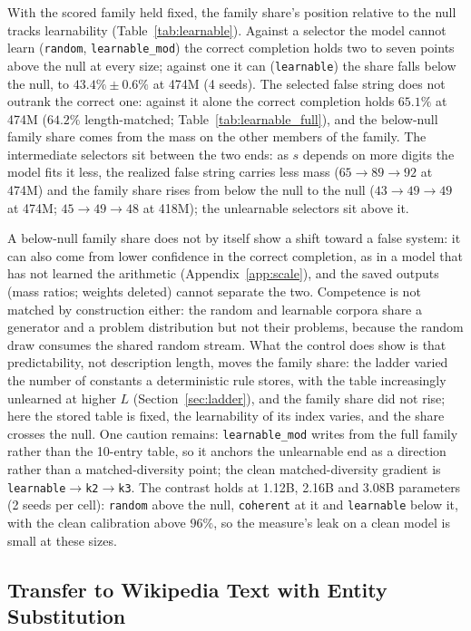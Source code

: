 \documentclass{article}
\begin{document}
With the scored family held fixed, the family share's position relative to the null tracks learnability (Table~\ref{tab:learnable}). Against a selector the model cannot learn (\texttt{random}, \texttt{learnable\_mod}) the correct completion holds two to seven points above the null at every size; against one it can (\texttt{learnable}) the share falls below the null, to $43.4\% \pm 0.6\%$ at 474M (4 seeds). The selected false string does not outrank the correct one: against it alone the correct completion holds $65.1\%$ at 474M ($64.2\%$ length-matched; Table~\ref{tab:learnable_full}), and the below-null family share comes from the mass on the other members of the family. The intermediate selectors sit between the two ends: as $s$ depends on more digits the model fits it less, the realized false string carries less mass ($65 \to 89 \to 92$ at 474M) and the family share rises from below the null to the null ($43 \to 49 \to 49$ at 474M; $45 \to 49 \to 48$ at 418M); the unlearnable selectors sit above it.

A below-null family share does not by itself show a shift toward a false system: it can also come from lower confidence in the correct completion, as in a model that has not learned the arithmetic (Appendix~\ref{app:scale}), and the saved outputs (mass ratios; weights deleted) cannot separate the two. Competence is not matched by construction either: the random and learnable corpora share a generator and a problem distribution but not their problems, because the random draw consumes the shared random stream. What the control does show is that predictability, not description length, moves the family share: the ladder varied the number of constants a deterministic rule stores, with the table increasingly unlearned at higher $L$ (Section~\ref{sec:ladder}), and the family share did not rise; here the stored table is fixed, the learnability of its index varies, and the share crosses the null. One caution remains: \texttt{learnable\_mod} writes from the full family rather than the 10-entry table, so it anchors the unlearnable end as a direction rather than a matched-diversity point; the clean matched-diversity gradient is \texttt{learnable}$\to$\texttt{k2}$\to$\texttt{k3}. The contrast holds at 1.12B, 2.16B and 3.08B parameters (2 seeds per cell): \texttt{random} above the null, \texttt{coherent} at it and \texttt{learnable} below it, with the clean calibration above $96\%$, so the measure's leak on a clean model is small at these sizes.

\subsection{Transfer to Wikipedia Text with Entity Substitution}
\label{sec:wikipedia}
\end{document}
